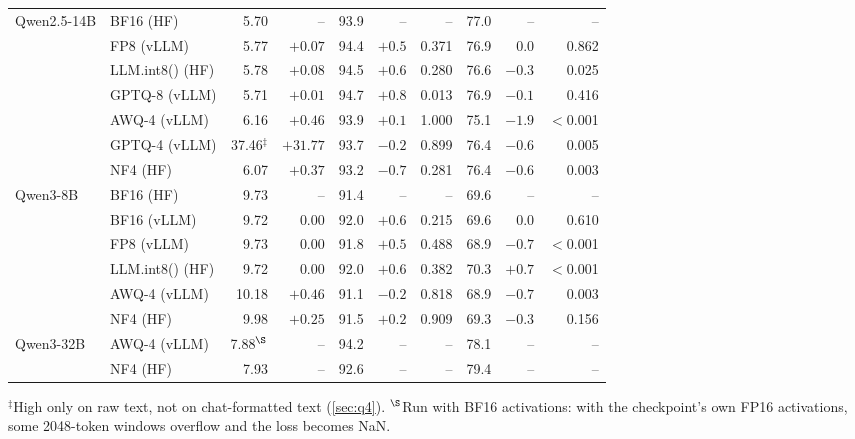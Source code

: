 \begin{table}[htbp]
\begin{tabular}{llrrrrrrrr}
Qwen2.5-14B & BF16 (HF) & 5.70 & -- & 93.9 & -- & -- & 77.0 & -- & -- \\
 & FP8 (vLLM) & 5.77 & $+0.07$ & 94.4 & $+0.5$ & 0.371 & 76.9 & $0.0$ & 0.862 \\
 & LLM.int8() (HF) & 5.78 & $+0.08$ & 94.5 & $+0.6$ & 0.280 & 76.6 & $-0.3$ & 0.025 \\
 & GPTQ-8 (vLLM) & 5.71 & $+0.01$ & 94.7 & $+0.8$ & 0.013 & 76.9 & $-0.1$ & 0.416 \\
 & AWQ-4 (vLLM) & 6.16 & $+0.46$ & 93.9 & $+0.1$ & 1.000 & 75.1 & $-1.9$ & $<$0.001 \\
 & GPTQ-4 (vLLM) & 37.46$^{\ddagger}$ & $+31.77$ & 93.7 & $-0.2$ & 0.899 & 76.4 & $-0.6$ & 0.005 \\
 & NF4 (HF) & 6.07 & $+0.37$ & 93.2 & $-0.7$ & 0.281 & 76.4 & $-0.6$ & 0.003 \\
Qwen3-8B & BF16 (HF) & 9.73 & -- & 91.4 & -- & -- & 69.6 & -- & -- \\
 & BF16 (vLLM) & 9.72 & $0.00$ & 92.0 & $+0.6$ & 0.215 & 69.6 & $0.0$ & 0.610 \\
 & FP8 (vLLM) & 9.73 & $0.00$ & 91.8 & $+0.5$ & 0.488 & 68.9 & $-0.7$ & $<$0.001 \\
 & LLM.int8() (HF) & 9.72 & $0.00$ & 92.0 & $+0.6$ & 0.382 & 70.3 & $+0.7$ & $<$0.001 \\
 & AWQ-4 (vLLM) & 10.18 & $+0.46$ & 91.1 & $-0.2$ & 0.818 & 68.9 & $-0.7$ & 0.003 \\
 & NF4 (HF) & 9.98 & $+0.25$ & 91.5 & $+0.2$ & 0.909 & 69.3 & $-0.3$ & 0.156 \\
Qwen3-32B & AWQ-4 (vLLM) & 7.88$^{\S}$ & -- & 94.2 & -- & -- & 78.1 & -- & -- \\
 & NF4 (HF) & 7.93 & -- & 92.6 & -- & -- & 79.4 & -- & -- \\
\bottomrule
\end{tabular}
\par\vspace{3pt}\parbox{\linewidth}{\scriptsize $^{\ddagger}$High only on raw text, not on chat-formatted text (\cref{sec:q4}). $^{\S}$Run with BF16 activations: with the checkpoint's own FP16 activations, some 2048-token windows overflow and the loss becomes NaN.}
\end{table}
